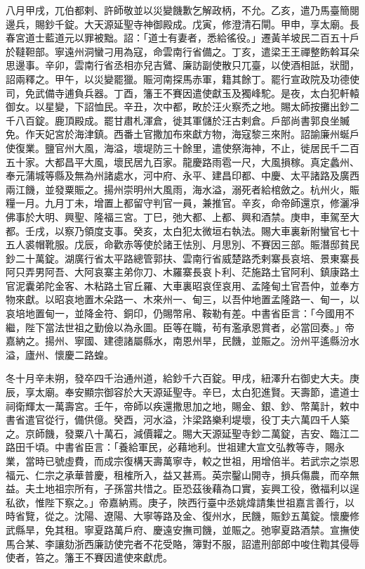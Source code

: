 \begin{pinyinscope}
 八月甲戌，兀伯都剌、許師敬並以災變饑歉乞解政柄，不允。乙亥，遣乃馬臺簡閱邊兵，賜鈔千錠。大天源延聖寺神御殿成。戊寅，修澄清石閘。甲申，享太廟。長春宮道士藍道元以罪被黜。詔：「道士有妻者，悉給徭役。」遷黃羊坡民二百五十戶於韃靼部。寧遠州洞蠻刁用為寇，命雲南行省備之。丁亥，遣梁王王禪整飭斡耳朵思邊事。辛卯，雲南行省丞相亦兒吉鷿、廉訪副使散只兀臺，以使酒相詆，狀聞，詔兩釋之。甲午，以災變罷獵。賑河南探馬赤軍，籍其餘丁。罷行宣政院及功德使司，免武備寺逋負兵器。丁酉，籓王不賽因遣使獻玉及獨峰駝。是夜，太白犯軒轅御女。以星變，下詔恤民。辛丑，次中都，畋於汪火察禿之地。賜太師按攤出鈔二千八百錠。鹿頂殿成。罷甘肅札渾倉，徙其軍儲於汪古剌倉。戶部尚書郭良坐贓免。作天妃宮於海津鎮。西番土官撒加布來獻方物，海寇黎三來附。詔諭廉州蜒戶使復業。鹽官州大風，海溢，壞堤防三十餘里，遣使祭海神，不止，徙居民千二百五十家。大都昌平大風，壞民居九百家。龍慶路雨雹一尺，大風損稼。真定蠡州、奉元蒲城等縣及無為州諸處水，河中府、永平、建昌印都、中慶、太平諸路及廣西兩江饑，並發粟賑之。揚州崇明州大風雨，海水溢，溺死者給棺斂之。杭州火，賑糧一月。九月丁未，增置上都留守判官一員，兼推官。辛亥，命帝師還京，修灑凈佛事於大明、興聖、隆福三宮。丁巳，弛大都、上都、興和酒禁。庚申，車駕至大都。壬戌，以察乃領度支事。癸亥，太白犯太微垣右執法。賜大車裏新附蠻官七十五人裘帽靴服。戊辰，命歡赤等使於諸王怯別、月思別、不賽因三部。賑潛邸貧民鈔二十萬錠。湖廣行省太平路總管郭扶、雲南行省威楚路禿剌寨長哀培、景東寨長阿只弄男阿吾、大阿哀寨主弟你刀、木羅寨長哀卜利、茫施路土官阿利、鎮康路土官泥囊弟陀金客、木粘路土官丘羅、大車裏昭哀侄哀用、孟隆甸土官吾仲，並奉方物來獻。以昭哀地置木朵路一、木來州一、甸三，以吾仲地置孟隆路一、甸一，以哀培地置甸一，並降金符、銅印，仍賜幣帛、鞍勒有差。中書省臣言：「今國用不繼，陛下當法世祖之勤儉以為永圖。臣等在職，茍有濫承恩賞者，必當回奏。」帝嘉納之。揚州、寧國、建德諸屬縣水，南恩州旱，民饑，並賑之。汾州平遙縣汾水溢，廬州、懷慶二路蝗。



 冬十月辛未朔，發卒四千治通州道，給鈔千六百錠。甲戌，紐澤升右御史大夫。庚辰，享太廟。奉安顯宗御容於大天源延聖寺。辛巳，太白犯進賢。天壽節，遣道士祠衛輝太一萬壽宮。壬午，帝師以疾還撒思加之地，賜金、銀、鈔、幣萬計，敕中書省遣官從行，備供億。癸酉，河水溢，汴梁路樂利堤壞，役丁夫六萬四千人築之。京師饑，發粟八十萬石，減價糶之。賜大天源延聖寺鈔二萬錠，吉安、臨江二路田千頃。中書省臣言：「養給軍民，必藉地利。世祖建大宣文弘教等寺，賜永業，當時已號虛費，而成宗復構天壽萬寧寺，較之世祖，用增倍半。若武宗之崇恩福元、仁宗之承華普慶，租榷所入，益又甚焉。英宗鑿山開寺，損兵傷農，而卒無益。夫土地祖宗所有，子孫當共惜之。臣恐茲後藉為口實，妄興工役，徼福利以逞私欲，惟陛下察之。」帝嘉納焉。庚子，陜西行臺中丞姚煒請集世祖嘉言善行，以時省覽，從之。沈陽、遼陽、大寧等路及金、復州水，民饑，賑鈔五萬錠。懷慶修武縣旱，免其租。寧夏路萬戶府、慶遠安撫司饑，並賑之。弛寧夏路酒禁。宣撫使馬合某、李讓劾浙西廉訪使完者不花受賂，簿對不服，詔遣刑部郎中唆住鞫其侵辱使者，笞之。籓王不賽因遣使來獻虎。




\end{pinyinscope}
